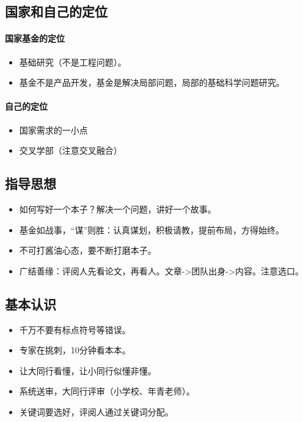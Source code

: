 \subsection{国家和自己的定位}
\paragraph{国家基金的定位}
\begin{itemize}
\item 基础研究（不是工程问题）。
\item 基金不是产品开发，基金是解决局部问题，局部的基础科学问题研究。
\end{itemize}

\paragraph{自己的定位}
\begin{itemize}
\item 国家需求的一小点
\item 交叉学部（注意交叉融合）
\end{itemize}


\subsection{指导思想}
\begin{itemize}
\item 如何写好一个本子？解决一个问题，讲好一个故事。

\item 基金如战事，“谋”则胜：认真谋划，积极请教，提前布局，方得始终。

\item 不可打酱油心态，要不断打磨本子。

\item 广结善缘：评阅人先看论文，再看人。文章->团队出身->内容。注意选口。
\end{itemize}


\subsection{基本认识}
\begin{itemize}
\item 千万不要有标点符号等错误。
\item 专家在挑刺，10分钟看本本。
\item 让大同行看懂，让小同行似懂非懂。
\item 系统送审，大同行评审（小学校、年青老师）。
\item 关键词要选好，评阅人通过关键词分配。
\end{itemize}



